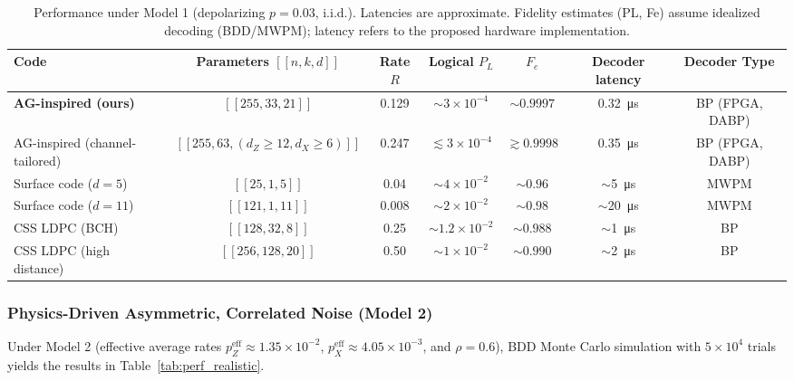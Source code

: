 \begin{table*}[t]
\centering
\caption{Performance under Model 1 (depolarizing \(p=0.03\), i.i.d.). Latencies are approximate. Fidelity estimates (PL, Fe) assume idealized decoding (BDD/MWPM); latency refers to the proposed hardware implementation.}
\label{tab:perf_idealized}
\begin{tabular}{lcccccc}
\toprule
\textbf{Code} & \textbf{Parameters $[[n,k,d]]$} & \textbf{Rate $R$} & \textbf{Logical $P_L$} & \textbf{$F_e$} & \textbf{Decoder latency} & \textbf{Decoder Type} \\
\midrule
\textbf{AG-inspired (ours)} & $[[255,33,21]]$ & 0.129 & \(\sim 3\times 10^{-4}\) & \(\sim 0.9997\) & \SI{0.32}{\micro\second} & BP (FPGA, DABP) \\
AG-inspired (channel-tailored) & $[[255,63, (d_Z\ge 12,d_X\ge 6)]]$ & 0.247 & \(\lesssim 3\times 10^{-4}\) & \(\gtrsim 0.9998\) & \SI{0.35}{\micro\second} & BP (FPGA, DABP) \\
Surface code ($d=5$) & $[[25,1,5]]$ & 0.04 & \(\sim 4\times 10^{-2}\) & \(\sim 0.96\) & \(\sim\)\SI{5}{\micro\second} & MWPM \\
Surface code ($d=11$) & $[[121,1,11]]$ & 0.008 & \(\sim 2\times 10^{-2}\) & \(\sim 0.98\) & \(\sim\)\SI{20}{\micro\second} & MWPM \\
CSS LDPC (BCH) & $[[128,32,8]]$ & 0.25 & \(\sim 1.2\times 10^{-2}\) & \(\sim 0.988\) & \(\sim\)\SI{1}{\micro\second} & BP \\
CSS LDPC (high distance) & $[[256,128,20]]$ & 0.50 & \(\sim 1\times 10^{-2}\) & \(\sim 0.990\) & \(\sim\)\SI{2}{\micro\second} & BP \\
\bottomrule
\end{tabular}
\end{table*}

\subsubsection{Physics-Driven Asymmetric, Correlated Noise (Model 2)}\label{sec:realistic}
Under Model 2 (effective average rates \(p_Z^{\mathrm{eff}}\approx1.35\times10^{-2}\), \(p_X^{\mathrm{eff}}\approx4.05\times10^{-3}\), and \(\rho=0.6\)), BDD Monte Carlo simulation with \(5\times10^4\) trials yields the results in Table~\ref{tab:perf_realistic}.

